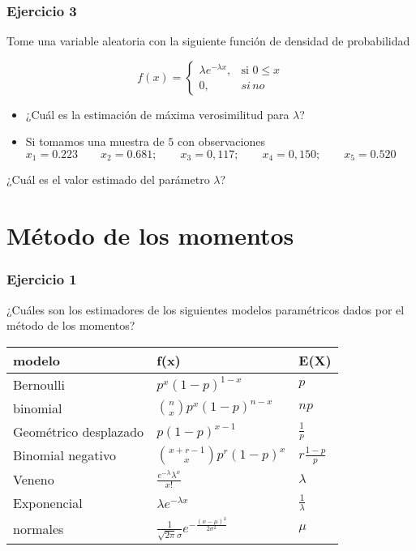 \documentclass[
]{book}
\begin{document}
\hypertarget{ejercicio-3-4}{%
\subsubsection{Ejercicio 3}\label{ejercicio-3-4}}

Tome una variable aleatoria con la siguiente función de densidad de probabilidad

\[
    f(x)= 
\begin{cases}
    \lambda e^{-\lambda x},& \text{si } 0 \leq x\\
    0,& si \, no 
\end{cases}
\]

\begin{itemize}
\item
  ¿Cuál es la estimación de máxima verosimilitud para \(\lambda\)?
\item
  Si tomamos una muestra de \(5\) con observaciones
  \(x_1 = 0.223 \qquad x_2 = 0.681; \qquad x_3 = 0,117; \qquad x_4 = 0,150; \qquad x_5 = 0.520\)
\end{itemize}

¿Cuál es el valor estimado del parámetro \(\lambda\)?

\hypertarget{muxe9todo-de-los-momentos}{%
\section{Método de los momentos}\label{muxe9todo-de-los-momentos}}

\hypertarget{ejercicio-1-8}{%
\subsubsection{Ejercicio 1}\label{ejercicio-1-8}}

¿Cuáles son los estimadores de los siguientes modelos paramétricos dados por el método de los momentos?

\begin{longtable}[]{@{}lll@{}}
\toprule
modelo & f(x) & E(X) \\
\midrule
\endhead
Bernoulli & \(p^x(1-p)^{1-x}\) & \(p\) \\
binomial & \(\binom n x p^x(1-p)^{n-x}\) & \(np\) \\
Geométrico desplazado & \(p(1-p)^{x-1}\) & \(\frac{1}{p}\) \\
Binomial negativo & \(\binom {x+r-1} x p^r(1-p)^x\) & \(r\frac{1-p}{p}\) \\
Veneno & \(\frac{e^{-\lambda}\lambda^x}{x!}\) & \(\lambda\) \\
Exponencial & \(\lambda e^{-\lambda x}\) & \(\frac{1}{\lambda}\) \\
normales & \(\frac{1}{\sqrt{2\pi}\sigma}e^{-\frac{(x-\mu)^2}{2\sigma^2}}\) & \(\mu\) \\
\bottomrule
\end{longtable}
\end{document}

